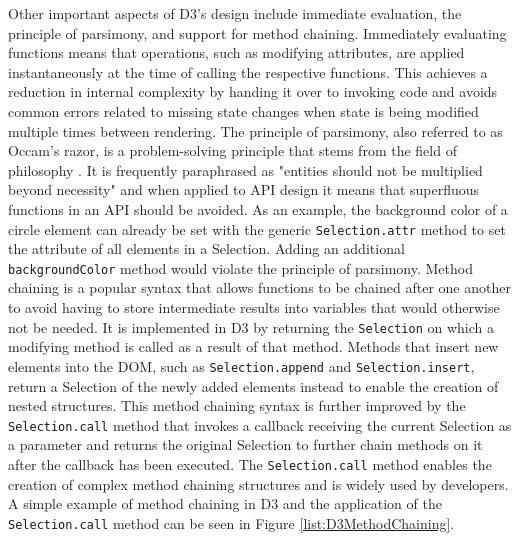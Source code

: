 Other important aspects of D3's design include immediate evaluation, the principle of parsimony, and support for method chaining. Immediately evaluating functions means that operations, such as modifying attributes, are applied instantaneously at the time of calling the respective functions. This achieves a reduction in internal complexity by handing it over to invoking code and avoids common errors related to missing state changes when state is being modified multiple times between rendering. The principle of parsimony, also referred to as Occam's razor, is a problem-solving principle that stems from the field of philosophy \parencite{PrincipleOfParsimony}. It is frequently paraphrased as "entities should not be multiplied beyond necessity" and when applied to API design it means that superfluous functions in an API should be avoided. As an example, the background color of a circle element can already be set with the generic \lstinline{Selection.attr} method to set the  attribute of all elements in a Selection. Adding an additional \lstinline{backgroundColor} method would violate the principle of parsimony. Method chaining is a popular syntax that allows functions to be chained after one another to avoid having to store intermediate results into variables that would otherwise not be needed. It is implemented in D3 by returning the \lstinline{Selection} on which a modifying method is called as a result of that method. Methods that insert new elements into the DOM, such as \lstinline{Selection.append} and \lstinline{Selection.insert}, return a Selection of the newly added elements instead to enable the creation of nested structures. This method chaining syntax is further improved by the \lstinline{Selection.call} method that invokes a callback receiving the current Selection as a parameter and returns the original Selection to further chain methods on it after the callback has been executed. The \lstinline{Selection.call} method enables the creation of complex method chaining structures and is widely used by developers. A simple example of method chaining in D3 and the application of the \lstinline{Selection.call} method can be seen in Figure \ref{list:D3MethodChaining}.

\begin{samepage}
 simple example of method chaining in D3 that creates an  and  element inside a .
  },
]{listings/d3-method-chaining.js}
\end{samepage}

